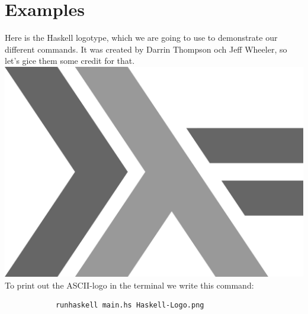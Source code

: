 \documentclass[12pt, a4paper]{article}
\newcounter{appendixpage}
\newenvironment{appendices}{
	\setcounter{appendixpage}{\arabic{page}}
	\stepcounter{appendixpage}
}{
}
\begin{document}
		
		


	\section{Examples}

	Here is the Haskell logotype, which we are going to use to demonstrate our different commands. It was created by Darrin Thompson och Jeff Wheeler, so let's gice them some credit for that. \\

	\includegraphics[scale=0.1]{Haskell-Logo.png} \\

	To print out the ASCII-logo in the terminal we write this command:
	\begin{footnotesize}
		\begin{verbatim}
			runhaskell main.hs Haskell-Logo.png
		\end{verbatim}
	\end{footnotesize} 
\end{document}
